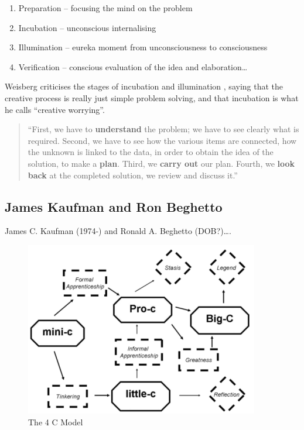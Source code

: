 \begin{enumerate}
  \item Preparation – focusing the mind on the problem
  \item Incubation – unconscious internalising
  \item Illumination – eureka moment from unconsciousness to consciousness
  \item Verification – conscious evaluation of the idea and elaboration…
\end{enumerate}

Weisberg criticises the stages of incubation and illumination \citep[referred to by][]{Partridge1994}, saying that the creative process is really just simple problem solving, and that incubation is what he calls ``creative worrying''.

\begin{quote}
  ``First, we have to \textbf{understand} the problem; we have to see clearly what is required. Second, we have to see how the various items are connected, how the unknown is linked to the data, in order to obtain the idea of the solution, to make a \textbf{plan}. Third, we \textbf{carry out} our plan. Fourth, we \textbf{look back} at the completed solution, we review and discuss it.'' \citep[p.5-6, his emphasis]{Polya1957}
\end{quote}


\subsection{James Kaufman and Ron Beghetto}

James C. Kaufman (1974-) and Ronald A. Beghetto (DOB?)\ldots\citep[See][]{Kaufman2009}.

\begin{figure}[htb] %
  \centering
  \includegraphics[width=\linewidth]{images/4C.png}
\caption[The 4 C Model]{The 4 C Model}
\label{fig:4C}
\end{figure}

